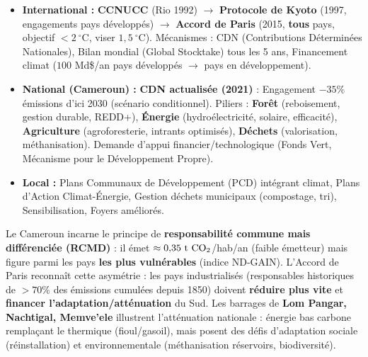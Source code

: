 \documentclass[11pt]{article}
\begin{document}
\begin{aretenir}
\begin{itemize}
\item \textbf{International :} \textbf{CCNUCC} (Rio 1992) $\rightarrow$ \textbf{Protocole de Kyoto} (1997, engagements pays développés) $\rightarrow$ \textbf{Accord de Paris} (2015, \textbf{tous} pays, objectif $<2\ ^\circ\text{C}$, viser $1{,}5\ ^\circ\text{C}$). Mécanismes : CDN (Contributions Déterminées Nationales), Bilan mondial (Global Stocktake) tous les 5 ans, Financement climat ($100$ Md\$/an pays développés $\rightarrow$ pays en développement).
\item \textbf{National (Cameroun) :} \textbf{CDN actualisée (2021)} : Engagement $-35\%$ émissions d'ici 2030 (scénario conditionnel). Piliers : \textbf{Forêt} (reboisement, gestion durable, REDD+), \textbf{Énergie} (hydroélectricité, solaire, efficacité), \textbf{Agriculture} (agroforesterie, intrants optimisés), \textbf{Déchets} (valorisation, méthanisation). Demande d'appui financier/technologique (Fonds Vert, Mécanisme pour le Développement Propre).
\item \textbf{Local :} Plans Communaux de Développement (PCD) intégrant climat, Plans d'Action Climat-Énergie, Gestion déchets municipaux (compostage, tri), Sensibilisation, Foyers améliorés.
\end{itemize}
\end{aretenir}

\begin{savaistu}
Le Cameroun incarne le principe de \textbf{responsabilité commune mais différenciée (RCMD)} : il émet $\approx 0{,}35\ \text{t}\ \ce{CO2}$/hab/an (faible émetteur) mais figure parmi les pays \textbf{les plus vulnérables} (indice ND-GAIN). L'Accord de Paris reconnaît cette asymétrie : les pays industrialisés (responsables historiques de $>70\%$ des émissions cumulées depuis 1850) doivent \textbf{réduire plus vite} et \textbf{financer l'adaptation/atténuation} du Sud. Les barrages de \textbf{Lom Pangar, Nachtigal, Memve'ele} illustrent l'atténuation nationale : énergie bas carbone remplaçant le thermique (fioul/gasoil), mais posent des défis d'adaptation sociale (réinstallation) et environnementale (méthanisation réservoirs, biodiversité).
\end{savaistu}
\end{document}
